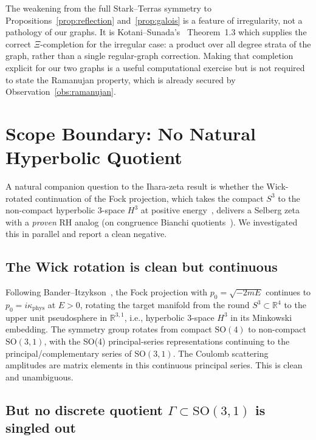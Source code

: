 \documentclass[11pt]{article}
\begin{document}
The weakening from the full Stark--Terras symmetry to
Propositions~\ref{prop:reflection} and~\ref{prop:galois} is a feature
of irregularity, not a pathology of our graphs.  It is
Kotani--Sunada's~\cite{kotani2000} Theorem~1.3 which supplies the
correct $\Xi$-completion for the irregular case: a product over all
degree strata of the graph, rather than a single regular-graph
correction.  Making that completion explicit for our two graphs is a
useful computational exercise but is not required to state the
Ramanujan property, which is already secured by
Observation~\ref{obs:ramanujan}.

\section{Scope Boundary: No Natural Hyperbolic Quotient}
\label{sec:scope_boundary}

A natural companion question to the Ihara-zeta result is whether the
Wick-rotated continuation of the Fock projection, which takes the
compact $S^3$ to the non-compact hyperbolic 3-space $H^3$ at positive
energy~\cite{bander1966}, delivers a Selberg zeta with a \emph{proven}
RH analog (on congruence Bianchi quotients~\cite{egm1998}).  We
investigated this in parallel and report a clean negative.

\subsection{The Wick rotation is clean but continuous}

Following Bander--Itzykson~\cite{bander1966}, the Fock projection with
$p_0=\sqrt{-2mE}$ continues to $p_0=i\kappa_{\mathrm{phys}}$ at
$E>0$, rotating the target manifold from the round $S^3\subset
\mathbb{R}^4$ to the upper unit pseudosphere in $\mathbb{R}^{3,1}$,
i.e., hyperbolic 3-space $H^3$ in its Minkowski embedding.  The
symmetry group rotates from compact $\mathrm{SO}(4)$ to non-compact
$\mathrm{SO}(3,1)$, with the SO(4) principal-series
representations continuing to the principal/complementary series of
$\mathrm{SO}(3,1)$.  The Coulomb scattering amplitudes are matrix
elements in this continuous principal series.  This is clean and
unambiguous.

\subsection{But no discrete quotient $\Gamma\subset\mathrm{SO}(3,1)$
is singled out}
\end{document}
